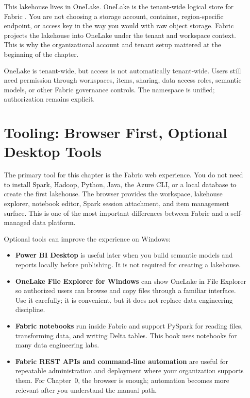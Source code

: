 This lakehouse lives in OneLake. OneLake is the tenant-wide logical store for Fabric \cite{microsoftOneLakeOverview}. You are not choosing a storage account, container, region-specific endpoint, or access key in the way you would with raw object storage. Fabric projects the lakehouse into OneLake under the tenant and workspace context. This is why the organizational account and tenant setup mattered at the beginning of the chapter.

\begin{notebox}
OneLake is tenant-wide, but access is not automatically tenant-wide. Users still need permission through workspaces, items, sharing, data access roles, semantic models, or other Fabric governance controls. The namespace is unified; authorization remains explicit.
\end{notebox}

\section{Tooling: Browser First, Optional Desktop Tools}
The primary tool for this chapter is the Fabric web experience. You do not need to install Spark, Hadoop, Python, Java, the Azure CLI, or a local database to create the first lakehouse. The browser provides the workspace, lakehouse explorer, notebook editor, Spark session attachment, and item management surface. This is one of the most important differences between Fabric and a self-managed data platform.

Optional tools can improve the experience on Windows:
\begin{itemize}
    \item \textbf{Power BI Desktop} is useful later when you build semantic models and reports locally before publishing. It is not required for creating a lakehouse.
    \item \textbf{OneLake File Explorer for Windows} can show OneLake in File Explorer so authorized users can browse and copy files through a familiar interface. Use it carefully; it is convenient, but it does not replace data engineering discipline.
    \item \textbf{Fabric notebooks} run inside Fabric and support PySpark for reading files, transforming data, and writing Delta tables. This book uses notebooks for many data engineering labs.
    \item \textbf{Fabric REST APIs and command-line automation} are useful for repeatable administration and deployment where your organization supports them. For Chapter~0, the browser is enough; automation becomes more relevant after you understand the manual path.
\end{itemize}

